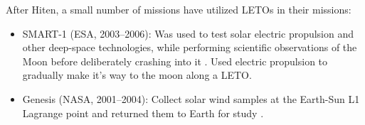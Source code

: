 After Hiten, a small number of missions have utilized LETOs in their missions:
\begin{itemize}
	\item SMART-1 (ESA, 2003--2006): Was used to test solar electric propulsion and other deep-space technologies, while performing scientific observations of the Moon before deliberately crashing into it \cite{ESA}. Used electric propulsion to gradually make it's way to the moon along a LETO.
    \item Genesis (NASA, 2001--2004): Collect solar wind samples at the Earth-Sun L1 Lagrange point and returned them to Earth for study \cite{NASAa}.
\end{itemize}
